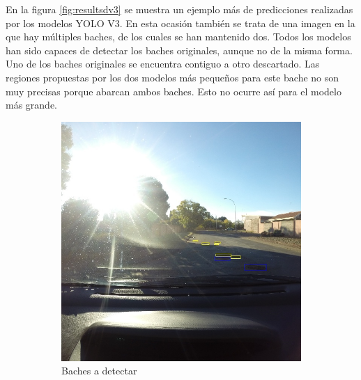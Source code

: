 En la figura \ref{fig:resultsdv3} se muestra un ejemplo más de predicciones realizadas por los modelos YOLO V3. En esta ocasión también se trata de una imagen en la que hay múltiples baches, de los cuales se han mantenido dos. Todos los modelos han sido capaces de detectar los baches originales, aunque no de la misma forma. Uno de los baches originales se encuentra contiguo a otro descartado. Las regiones propuestas por los dos modelos más pequeños para este bache no son muy precisas porque abarcan ambos baches. Esto no ocurre así para el modelo más grande.

\begin{figure}[H]
	\centering
	\begin{subfigure}[h]{0.45\linewidth}
		\includegraphics[width=\linewidth]{images/results_d_gt.jpg}
		\caption{Baches a detectar}
	\end{subfigure}
	\begin{subfigure}[h]{0.45\linewidth}

\end{subfigure}
\end{figure}
